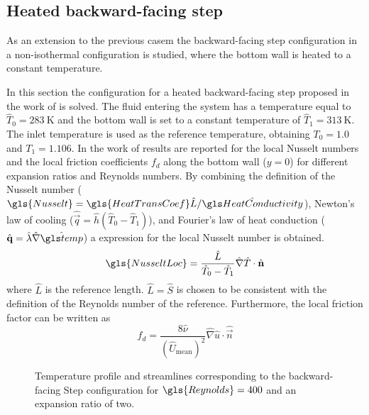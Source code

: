 
\subsection{Heated backward-facing step}\label{ssec:HeatedBackwardFacingStep}


As an extension to the previous casem the backward-facing step configuration in a non-isothermal configuration is studied, where the bottom wall is heated to a constant temperature. 


In this section the configuration for a heated backward-facing step proposed in the work of \textcite{xieFluidFlowHeat2016} is solved. 
The fluid entering the system has a temperature equal to $\hat T_0 = \SI{283}{\kelvin}$ and the bottom wall is set to a constant temperature of $\hat T_1 =\SI{313}{\kelvin}$. The inlet temperature is used as the reference temperature, obtaining $T_0 = 1.0$ and $T_1 = 1.106$.
In the work of \textcite{xieFluidFlowHeat2016} results are reported for the local Nusselt numbers and the local friction coefficients $f_d$  along the bottom wall ($y = 0$) for different expansion ratios and Reynolds numbers.
By combining the definition of the Nusselt number ($\gls{Nusselt} = \gls{HeatTransCoef}\hat{L}/\glsHat{HeatConductivity}$), Newton's law of cooling ($\hat{\vec{q}} = \hat{h} (\hat{T}_0 - \hat{T}_1 )$), and Fourier's law of heat conduction ($\hat{\vec{q}} = \hat \lambda \hat{\nabla} \glsHat{temp}$) a expression for the local Nusselt number is obtained.
\begin{equation}
	\gls{NusseltLoc} = \frac{\hat L}{\hat T_0-\hat T_1}\hat \nabla \hat T \cdot \hat {\vec{n}}
\end{equation}
where $\hat L$ is the reference length. $ \hat L = \hat S$ is chosen to be consistent with the definition of the Reynolds number of the reference. Furthermore, the local friction factor can be written as %
\begin{equation}
	f_d = \frac{8\hat \nu} { (\hat U_{\text{mean}})^2}  \hat \nabla \hat u \cdot \hat {\vec{n}}
\end{equation}

\begin{figure}[t]
	\centering
	\pgfplotsset{width=0.81\textwidth, compat=1.3}
	\caption{Temperature profile and streamlines corresponding to the backward-facing Step configuration for $\gls{Reynolds} = 400$ and an expansion ratio of two.} \label{fig:BFS_Temperature_Streamlines}
\end{figure}

